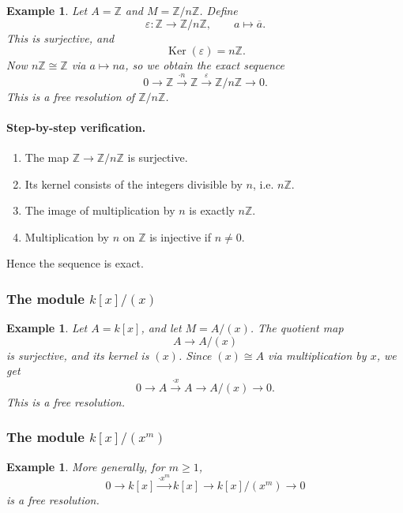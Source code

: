 \documentclass[12pt,a4paper]{article}
\theoremstyle{notespace}
\newtheorem{example}[definition]{Example}
\newcommand{\kerf}{\operatorname{Ker}}
\newcommand{\ZZ}{\mathbb{Z}}
\begin{document}
\begin{example}
	Let \(A=\ZZ\) and \(M=\ZZ/n\ZZ\). Define
	\[
	\varepsilon:\ZZ\to \ZZ/n\ZZ,\qquad a\mapsto \overline{a}.
	\]
	This is surjective, and
	\[
	\kerf(\varepsilon)=n\ZZ.
	\]
	Now \(n\ZZ\cong \ZZ\) via \(a\mapsto na\), so we obtain the exact sequence
	\[
	0\longrightarrow \ZZ \xrightarrow{\cdot n} \ZZ \xrightarrow{\varepsilon} \ZZ/n\ZZ \longrightarrow 0.
	\]
	This is a free resolution of \(\ZZ/n\ZZ\).
\end{example}

\paragraph{Step-by-step verification.}

\begin{enumerate}[leftmargin=2em]
	\item The map \(\ZZ\to \ZZ/n\ZZ\) is surjective.
	\item Its kernel consists of the integers divisible by \(n\), i.e. \(n\ZZ\).
	\item The image of multiplication by \(n\) is exactly \(n\ZZ\).
	\item Multiplication by \(n\) on \(\ZZ\) is injective if \(n\neq 0\).
\end{enumerate}
Hence the sequence is exact.

\subsubsection{The module \(k[x]/(x)\)}

\begin{example}
	Let \(A=k[x]\), and let \(M=A/(x)\). The quotient map
	\[
	A\to A/(x)
	\]
	is surjective, and its kernel is \((x)\). Since \((x)\cong A\) via multiplication by \(x\), we get
	\[
	0\longrightarrow A \xrightarrow{\cdot x} A \longrightarrow A/(x) \longrightarrow 0.
	\]
	This is a free resolution.
\end{example}

\subsubsection{The module \(k[x]/(x^m)\)}

\begin{example}
	More generally, for \(m\geq 1\),
	\[
	0\longrightarrow k[x] \xrightarrow{\cdot x^m} k[x] \longrightarrow k[x]/(x^m) \longrightarrow 0
	\]
	is a free resolution.
\end{example}
\end{document}
